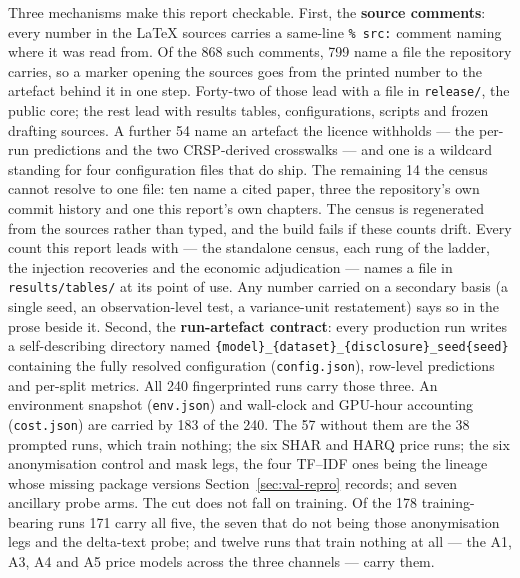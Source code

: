 Three mechanisms make this report checkable. First, the \textbf{source
comments}: every number in the \LaTeX{} sources carries a same-line
\texttt{\% src:} comment naming where it was read from. Of the 868 such comments, 799 name a file the repository carries, so a
marker opening the sources goes from the printed number to the artefact behind
it in one step. Forty-two of those lead with a file in \texttt{release/}, the
public core; the rest lead with results tables, configurations, scripts and
frozen drafting sources. A further 54 name an artefact the licence withholds ---
the per-run predictions and the two CRSP-derived crosswalks --- and one is a
wildcard standing for four configuration files that do ship. The
remaining 14 the census cannot resolve to one file: ten name a cited paper, three
the repository's own commit history and one this report's own chapters. The census is regenerated
from the sources rather than typed, and the build fails if these counts drift.
Every count this report leads
with --- the standalone census, each rung of the ladder, the injection
recoveries and the economic adjudication --- names a file in
\texttt{results/tables/} at its point of use. Any number carried on a secondary basis (a single seed, an
observation-level test, a variance-unit restatement) says so in the prose
beside it. Second, the \textbf{run-artefact contract}: every production run
writes a self-describing directory named
\texttt{\{model\}\_\{dataset\}\_\{disclosure\}\_seed\{seed\}} containing the
fully resolved configuration (\texttt{config.json}), row-level predictions and
per-split metrics. All 240 fingerprinted runs carry those three. An environment
snapshot (\texttt{env.json}) and wall-clock and GPU-hour accounting
(\texttt{cost.json}) are carried by 183 of the 240. The 57 without them are the
38 prompted runs, which train nothing; the six SHAR and HARQ price runs; the six
anonymisation control and mask legs, the four TF--IDF ones being the lineage
whose missing package versions Section~\ref{sec:val-repro} records; and seven
ancillary probe arms. The cut does not fall on training. Of the 178
training-bearing runs 171 carry all five, the seven that do not being those
anonymisation legs and the delta-text probe; and twelve runs that train nothing
at all --- the A1, A3, A4 and A5 price models across the three channels --- carry
them.
